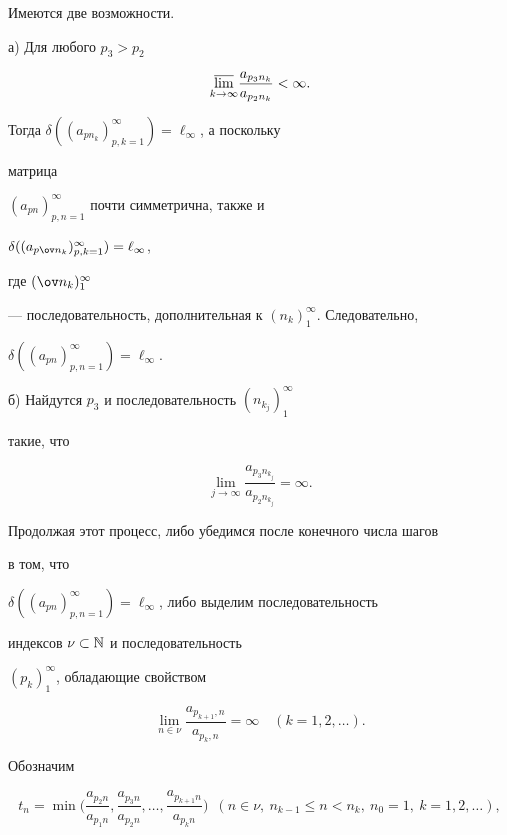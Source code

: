 Имеются две возможности.





а) Для любого $p_3>p_2$


$$


\underset{k\to\infty}{\varlimsup}\frac{a_{p_3n_k}}{a_{p_2n_k}}<\infty.


$$


Тогда $\delta((a_{pn_k})^\infty_{p,k=1})=\ell_\infty$, а поскольку


матрица


$(a_{pn})^\infty_{p,n=1}$ почти симметрична, также и\linebreak


$\delta ((a_{p\ov n_k})^\infty_{p,k=1})=\ell_\infty$,


где $(\ov n_k)^\infty_1$


--- последовательность, дополнительная к $(n_k)^\infty_1$. Следовательно,


$\delta((a_{pn})^\infty_{p,n=1})=\ell_\infty$.





б) Найдутся $p_3$ и последовательность $(n_{k_j})^\infty_1$


такие, что


$$


\lim_{j\to\infty}\frac{a_{p_3n_{k_j}}}{a_{p_2n_{k_j}}}=\infty.


$$


Продолжая этот процесс, либо убедимся после конечного числа шагов


в том, что


$\delta((a_{pn})^\infty_{p,n=1})=\ell_\infty$, либо выделим последовательность


индексов $\nu\subset \Bbb N$ и последовательность


$(p_k)^\infty_1$, обладающие свойством


$$


\lim_{n\in\nu}\frac{a_{p_{k+1},n}}{a_{p_k,n}}=\infty \quad (k=1,2,\dotsc).


$$


Обозначим


$$


t_n=\min \bigg(\frac{a_{p_2n}}{a_{p_1n}}, \frac{a_{p_3n}}{a_{p_2n}}, \dotsc,


\frac{a_{p_{k+1}n}}{a_{p_kn}}\bigg)\ \;


(n\in\nu, \ n_{k-1}\leqslant n<n_k,\ n_0=1, \ k=1,2,\dotsc),


$$


